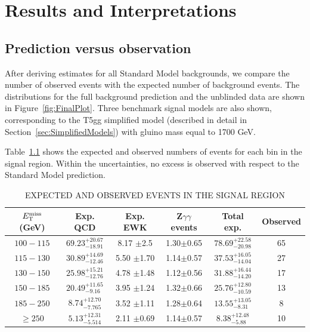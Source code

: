 \chapter{Results and Interpretations}
\label{chap:Results}

\section{Prediction versus observation}
\label{sec:fullCount}
After deriving estimates for all Standard Model backgrounds, we compare the number of 
observed events with the expected number of background events. 
The \ETmiss distributions for the full background prediction and the unblinded data are
shown in Figure~\ref{fig:FinalPlot}. Three benchmark signal models are also shown, 
corresponding to the T5gg simplified model 
(described in detail in Section~\ref{sec:SimplifiedModels}) with gluino mass equal to 1700 GeV.

Table~\ref{tab:ExpObs} shows the expected and observed numbers of events for each bin in the signal region.
Within the uncertainties, no excess is observed with respect to the Standard Model prediction.


\begin{table}[ht]
    \caption{EXPECTED AND OBSERVED EVENTS IN THE SIGNAL REGION}
    \centering
    \begin{tabular}{ |c|c|c|c|c|c|}
        \hline
        $E_{\mathrm{T}}^{\text{miss}}$ (GeV) & Exp. QCD & Exp. EWK &  Z$\gamma\gamma$ events  &Total exp. & Observed \\ [0.5ex]
        \hline
        $100 - 115$ & ${69.23}^{+20.67}_{-18.91}$ & 8.17 $\pm$2.5  & 1.30$\pm$0.65 & ${ 78.69 }^{+ 22.58 }_{- 20.98 }$ & 65  \\
        $115 - 130$ & ${30.89}^{+14.69}_{-12.46}$ & 5.50 $\pm$1.70 & 1.14$\pm$0.57 & ${ 37.53 }^{+ 16.05 }_{- 14.04 }$ & 27 \\
        $130 - 150$ & ${25.98}^{+15.21}_{-12.76}$ & 4.78 $\pm$1.48 & 1.12$\pm$0.56 & ${ 31.88 }^{+ 16.44 }_{- 14.20 }$ & 17 \\
        $150 - 185$ & ${20.49}^{+11.65}_{-9.16} $ & 3.95 $\pm$1.24 & 1.32$\pm$0.66 & ${ 25.76 }^{+ 12.80 }_{- 10.59 }$ & 13 \\
        $185 -  250$& ${8.74} ^{+12.70}_{-7.765}$ & 3.52 $\pm$1.11 & 1.28$\pm$0.64 & ${ 13.55 }^{+ 13.05 }_{- 8.31  }$ & 8  \\
        $\geq 250$  & ${5.13} ^{+12.31}_{-5.514}$ & 2.11 $\pm$0.69 & 1.14$\pm$0.57 & ${ 8.38  }^{+ 12.48 }_{- 5.88  }$ & 10 \\
        \hline
    \end{tabular}
    \label{tab:ExpObs}
\end{table}

